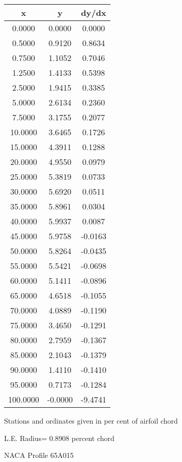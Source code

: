 \documentclass[11pt]{book}
\begin{document}
 \vspace{8mm}
 \begin{tabular}{|c|c|c|} \hline 
  x  &  y  &  dy/dx \\
 \hline
0.0000 & 0.0000 & 0.0000 \\
0.5000 & 0.9120 & 0.8634 \\
0.7500 & 1.1052 & 0.7046 \\
1.2500 & 1.4133 & 0.5398 \\
2.5000 & 1.9415 & 0.3385 \\
5.0000 & 2.6134 & 0.2360 \\
7.5000 & 3.1755 & 0.2077 \\
10.0000 & 3.6465 & 0.1726 \\
15.0000 & 4.3911 & 0.1288 \\
20.0000 & 4.9550 & 0.0979 \\
25.0000 & 5.3819 & 0.0733 \\
30.0000 & 5.6920 & 0.0511 \\
35.0000 & 5.8961 & 0.0304 \\
40.0000 & 5.9937 & 0.0087 \\
45.0000 & 5.9758 & -0.0163 \\
50.0000 & 5.8264 & -0.0435 \\
55.0000 & 5.5421 & -0.0698 \\
60.0000 & 5.1411 & -0.0896 \\
65.0000 & 4.6518 & -0.1055 \\
70.0000 & 4.0889 & -0.1190 \\
75.0000 & 3.4650 & -0.1291 \\
80.0000 & 2.7959 & -0.1367 \\
85.0000 & 2.1043 & -0.1379 \\
90.0000 & 1.4110 & -0.1410 \\
95.0000 & 0.7173 & -0.1284 \\
100.0000 & -0.0000 & -9.4741 \\
 \hline
 \end{tabular}
 \vspace{8mm}


Stations and ordinates given in per cent of airfoil chord 


L.E. Radius=  0.8908 percent chord
 \newpage
  \label{p65A015}
 \begin{Large}
 NACA Profile 65A015
 \end{Large}
  
\end{document}
